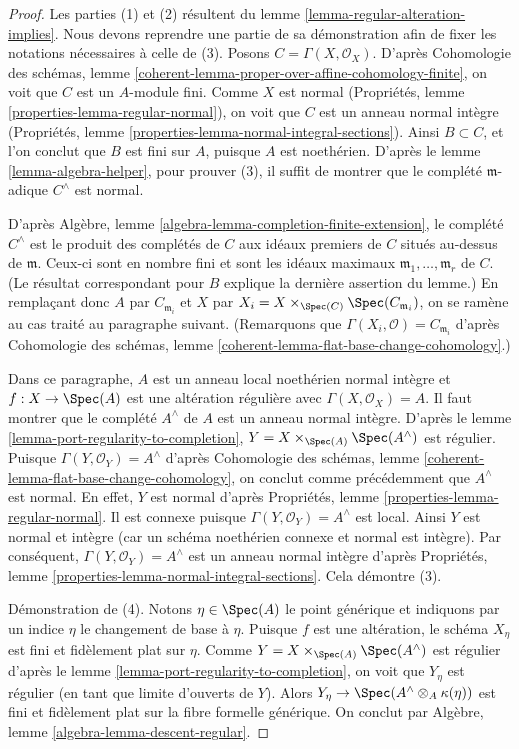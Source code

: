 \begin{proof} Les parties (1) et (2) résultent du lemme \ref{lemma-regular-alteration-implies}. Nous devons reprendre une partie de sa démonstration afin de fixer les notations nécessaires à celle de (3). Posons $C = \Gamma(X, \mathcal{O}_X)$. D'après Cohomologie des schémas, lemme \ref{coherent-lemma-proper-over-affine-cohomology-finite}, on voit que $C$ est un $A$-module fini. Comme $X$ est normal (Propriétés, lemme \ref{properties-lemma-regular-normal}), on voit que $C$ est un anneau normal intègre (Propriétés, lemme \ref{properties-lemma-normal-integral-sections}). Ainsi $B \subset C$, et l'on conclut que $B$ est fini sur $A$, puisque $A$ est noethérien. D'après le lemme \ref{lemma-algebra-helper}, pour prouver (3), il suffit de montrer que le complété $\mathfrak m$-adique $C^\wedge$ est normal.

\medskip\noindent D'après Algèbre, lemme \ref{algebra-lemma-completion-finite-extension}, le complété $C^\wedge$ est le produit des complétés de $C$ aux idéaux premiers de $C$ situés au-dessus de $\mathfrak m$. Ceux-ci sont en nombre fini et sont les idéaux maximaux $\mathfrak m_1, \ldots, \mathfrak m_r$ de $C$. (Le résultat correspondant pour $B$ explique la dernière assertion du lemme.) En remplaçant donc $A$ par $C_{\mathfrak m_i}$ et $X$ par $X_i = X \times_{\Spec(C)} \Spec(C_{\mathfrak m_i})$, on se ramène au cas traité au paragraphe suivant. (Remarquons que $\Gamma(X_i, \mathcal{O}) = C_{\mathfrak m_i}$ d'après Cohomologie des schémas, lemme \ref{coherent-lemma-flat-base-change-cohomology}.)

\medskip\noindent Dans ce paragraphe, $A$ est un anneau local noethérien normal intègre et $f : X \to \Spec(A)$ est une altération régulière avec $\Gamma(X, \mathcal{O}_X) = A$. Il faut montrer que le complété $A^\wedge$ de $A$ est un anneau normal intègre. D'après le lemme \ref{lemma-port-regularity-to-completion}, $Y = X \times_{\Spec(A)} \Spec(A^\wedge)$ est régulier. Puisque $\Gamma(Y, \mathcal{O}_Y) = A^\wedge$ d'après Cohomologie des schémas, lemme \ref{coherent-lemma-flat-base-change-cohomology}, on conclut comme précédemment que $A^\wedge$ est normal. En effet, $Y$ est normal d'après Propriétés, lemme \ref{properties-lemma-regular-normal}. Il est connexe puisque $\Gamma(Y, \mathcal{O}_Y) = A^\wedge$ est local. Ainsi $Y$ est normal et intègre (car un schéma noethérien connexe et normal est intègre). Par conséquent, $\Gamma(Y, \mathcal{O}_Y) = A^\wedge$ est un anneau normal intègre d'après Propriétés, lemme \ref{properties-lemma-normal-integral-sections}. Cela démontre (3).

\medskip\noindent Démonstration de (4). Notons $\eta \in \Spec(A)$ le point générique et indiquons par un indice $\eta$ le changement de base à $\eta$. Puisque $f$ est une altération, le schéma $X_\eta$ est fini et fidèlement plat sur $\eta$. Comme $Y = X \times_{\Spec(A)} \Spec(A^\wedge)$ est régulier d'après le lemme \ref{lemma-port-regularity-to-completion}, on voit que $Y_\eta$ est régulier (en tant que limite d'ouverts de $Y$). Alors $Y_\eta \to \Spec(A^\wedge \otimes_A \kappa(\eta))$ est fini et fidèlement plat sur la fibre formelle générique. On conclut par Algèbre, lemme \ref{algebra-lemma-descent-regular}. \end{proof}
